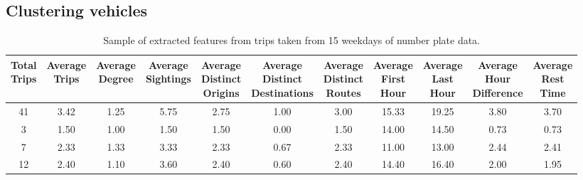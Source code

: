 \subsection{Clustering vehicles}\label{s.classification}

\begin{table*}[t]
\centering
\begin{tabular}{c c c c c c c c c c c}
  \hline
 \thead{Total\\Trips} & \thead{Average\\Trips} & \thead{Average\\Degree} & \thead{Average\\Sightings} & \thead{Average\\Distinct\\Origins} & \thead{Average\\Distinct\\Destinations} & \thead{Average\\Distinct\\Routes} & \thead{Average\\First\\Hour} & \thead{Average\\Last\\Hour} & \thead{Average\\Hour\\Difference} & \thead{Average\\Rest\\Time} \\
  \hline
41 & 3.42 & 1.25 & 5.75 & 2.75 & 1.00 & 3.00 & 15.33 & 19.25 & 3.80 & 3.70 \\
3 & 1.50 & 1.00 & 1.50 & 1.50 & 0.00 & 1.50 & 14.00 & 14.50 & 0.73 & 0.73 \\
7 & 2.33 & 1.33 & 3.33 & 2.33 & 0.67 & 2.33 & 11.00 & 13.00 & 2.44 & 2.41 \\
12 & 2.40 & 1.10 & 3.60 & 2.40 & 0.60 & 2.40 & 14.40 & 16.40 & 2.00 & 1.95 \\
   \hline
\end{tabular}
\caption{Sample of extracted features from trips taken from 15 weekdays of number plate data.}
\vspace{-0.2cm}
\label{t:features}
\end{table*}

